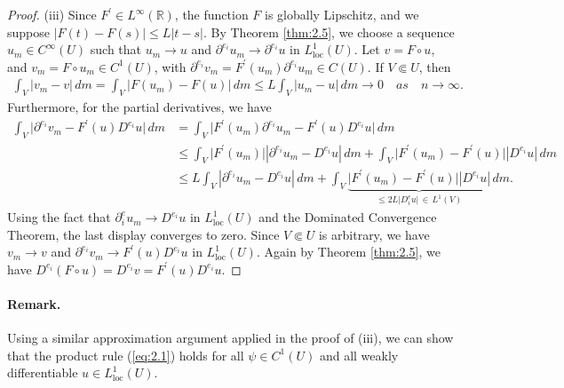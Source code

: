 \documentclass{article}
\numberwithin{equation}{section}
\newcommand{\bbR}{\mathbb{R}}
\newcommand{\loc}{\mathrm{loc}}
\theoremstyle{plain}
\theoremstyle{definition}
\begin{document}
\begin{proof}
(iii) Since $F^\prime\in L^\infty(\bbR)$, the function $F$ is globally Lipschitz, and we suppose $\vert F(t)-F(s)\vert\leq L\vert t-s\vert$. By Theorem \ref{thm:2.5}, we choose a sequence $u_m\in C^\infty(U)$ such that $u_m\to u$ and $\partial^{e_i}u_m\to\partial^{e_i}u$ in $L^1_\loc(U)$. Let $v=F\circ u$, and $v_m=F\circ u_m\in C^1(U)$, with $\partial^{e_i}v_m=F^\prime(u_m)\partial^{e_i}u_m\in C(U)$. If $V\Subset U$, then
\begin{align*}
	\int_V\vert v_m-v\vert\,dm=\int_V\vert F(u_m)-F(u)\vert\,dm\leq L\int_V\vert u_m-u\vert\,dm\to 0\quad as\quad n\to\infty.
\end{align*}
Furthermore, for the partial derivatives, we have
\begin{align*}
	\int_V\vert\partial^{e_i}v_m-F^\prime(u)D^{e_i}u\vert\,dm&=\int_V\vert F^\prime(u_m)\partial^{e_i}u_m-F^\prime(u)D^{e_i}u\vert\,dm\\
	&\leq\int_V\vert F^\prime(u_m)\vert\left\vert\partial^{e_i}u_m-D^{e_i}u\right\vert\,dm+\int_V\vert F^\prime(u_m)-F^\prime(u)\vert\left\vert D^{e_i}u\right\vert\,dm\\
	&\leq L\int_V\left\vert\partial^{e_i}u_m-D^{e_i}u\right\vert\,dm+\int_V\underbrace{\vert F^\prime(u_m)-F^\prime(u)\vert\left\vert D^{e_i}u\right\vert}_{\leq 2L\vert D^e_i u\vert\,\in\,L^1(V)}\,dm.
\end{align*}
Using the fact that $\partial^e_i u_m\to D^{e_i} u$ in $L^1_\loc(U)$ and the Dominated Convergence Theorem, the last display converges to zero. Since $V\Subset U$ is arbitrary, we have $v_m\to v$ and $\partial^{e_i}v_m\to F^\prime(u)D^{e_i}u$ in $L^1_\loc(U)$. Again by Theorem \ref{thm:2.5}, we have $D^{e_i}(F\circ u)=D^{e_i}v=F^\prime(u)D^{e_i}u$.
\end{proof}
\paragraph{Remark.} Using a similar approximation argument applied in the proof of (iii), we can show that the product rule (\ref{eq:2.1}) holds for all $\psi\in C^1(U)$ and all weakly differentiable $u\in L^1_\loc(U)$.
\end{document}
